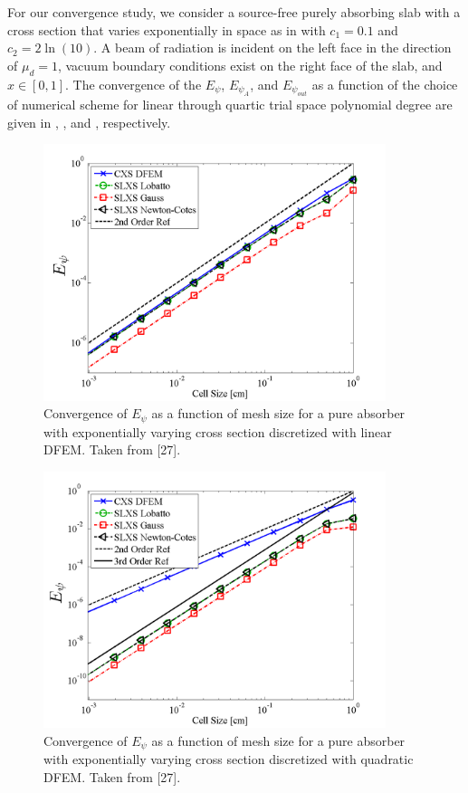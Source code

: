 For our convergence study, we consider a source-free purely absorbing slab with a cross section that varies exponentially in space as in  with $c_1 = 0.1$ and $c_2 = 2\ln(10)$.  
A beam of radiation is incident on the left face in the direction of $\mu_d=1$, vacuum boundary conditions exist on the right face of the slab, and $x\in[0, 1]$.  
The convergence of the $E_{\psi}$,  $E_{\psi_A}$, and $E_{\psi_{out}}$ as a function of the choice of numerical scheme for linear through quartic trial space polynomial degree are given in 
,  , and , respectively.  
\begin{figure}[!htp]
\centering
\includegraphics[width=10cm]{chapter3_variable_xs/P1_VarXS_E_psi_L2.png}
\caption{Convergence of $E_{\psi}$  as a function of mesh size for a pure absorber with exponentially varying cross section discretized with linear DFEM.  Taken from [27].}
\label{fig:varxs_psi_L2_p1}
\end{figure}
%
%
%
\begin{figure}[!hbp]
\centering
\includegraphics[width=10cm]{chapter3_variable_xs/P2_VarXS_E_psi_L2.png}
\caption{Convergence of $E_{\psi}$ as a function of mesh size for a pure absorber with exponentially varying cross section discretized with quadratic DFEM.  Taken from [27].}
\label{fig:varxs_psi_L2_p2}
\end{figure}


